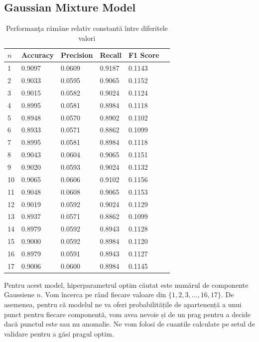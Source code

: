 \noindent

\subsection{Gaussian Mixture Model}

\begin{table}[H]
  \centering
  \begin{tabularx}{\textwidth}{
      |X
      |X
      |X
      |X
      |X
      |X|
  }
  \hline
  $n$ & {Accuracy} & {Precision} & {Recall} & {F1 Score} \\
  \hline
  \rowcolor{gray!20} 1 & 0.9097 & 0.0609 & 0.9187 & 0.1143 \\
  2 & 0.9033 & 0.0595 & 0.9065 & 0.1152 \\
  \rowcolor{gray!20} 3 & 0.9015 & 0.0582 & 0.9024 & 0.1124 \\
  4 & 0.8995 & 0.0581 & 0.8984 & 0.1118 \\
  \rowcolor{gray!20} 5 & 0.8948 & 0.0570 & 0.8902 & 0.1102 \\
  6 & 0.8933 & 0.0571 & 0.8862 & 0.1099 \\
  \rowcolor{gray!20} 7 & 0.8995 & 0.0581 & 0.8984 & 0.1118 \\
  8 & 0.9043 & 0.0604 & 0.9065 & 0.1151 \\
  \rowcolor{gray!20} 9 & 0.9020 & 0.0593 & 0.9024 & 0.1132 \\
  10 & 0.9065 & 0.0606 & 0.9102 & 0.1156 \\
  \rowcolor{gray!20} 11 & 0.9048 & 0.0608 & 0.9065 & 0.1153 \\
  12 & 0.9019 & 0.0592 & 0.9024 & 0.1129 \\
  \rowcolor{gray!20} 13 & 0.8937 & 0.0571 & 0.8862 & 0.1099 \\
  14 & 0.8979 & 0.0592 & 0.8943 & 0.1128 \\
  \rowcolor{gray!20} 15 & 0.9000 & 0.0592 & 0.8984 & 0.1120 \\
  16 & 0.8979 & 0.0591 & 0.8943 & 0.1127 \\
  \rowcolor{gray!20} 17 & 0.9006 & 0.0600 & 0.8984 & 0.1145 \\
  \hline
  \end{tabularx}
  \caption{Performanţa rămâne relativ constantă între diferitele valori}
\end{table}



Pentru acest model, hiperparametrul optim 
căutat este numărul de componente Gaussiene $n$. Vom încerca pe rând fiecare valoare
din $\{1, 2, 3, \ldots, 16, 17\}$. De asemenea, pentru că modelul 
ne va oferi probabilitățile de apartenență a unui punct pentru 
fiecare componentă, vom avea nevoie și de un prag pentru a decide 
dacă punctul este sau nu anomalie. Ne vom folosi de cuantile 
calculate pe setul de validare pentru a găsi pragul optim.

